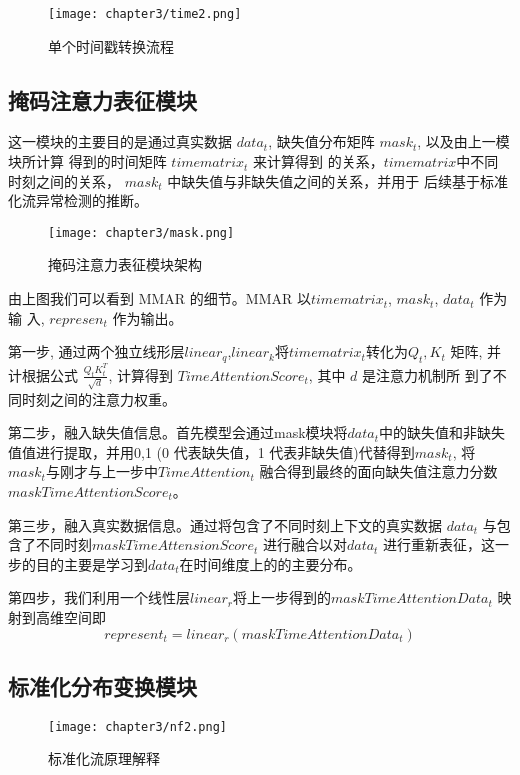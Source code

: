   \begin{figure}[ht]
    \centering
    \texttt{[image: chapter3/time2.png]}
    \caption{单个时间戳转换流程}
    \end{figure}
  
  \subsection{掩码注意力表征模块}
  这一模块的主要目的是通过真实数据 $data_t$, 缺失值分布矩阵 $mask_t$, 以及由上一模块所计算 得到的时间矩阵 $timematrix_t$ 来计算得到 的关系，$timematrix $中不同时刻之间的关系， $mask_t$ 中缺失值与非缺失值之间的关系，并用于 后续基于标准化流异常检测的推断。
  
  \begin{figure}[ht]
    \centering
    \texttt{[image: chapter3/mask.png]}
    \caption{掩码注意力表征模块架构}
    \end{figure}
  
  由上图我们可以看到 MMAR 的细节。MMAR 以$timematrix_t$, $mask_t$, $data_t$ 作为输 入, $represen_t$ 作为输出。
  
  第一步, 通过两个独立线形层$linear_q$,$linear_k$将$timematrix_t$转化为$Q_t, K_t$ 矩阵, 并计根据公式 $\frac{Q_t K_t^T}{\sqrt{d}}$, 计算得到 $TimeAttentionScore_t$, 其中 $d$ 是注意力机制所 到了不同时刻之间的注意力权重。
  
  第二步，融入缺失值信息。首先模型会通过mask模块将$data_t$中的缺失值和非缺失值值进行提取，并用0,1 (0 代表缺失值，1 代表非缺失值)代替得到$mask_t$, 将$mask_t$与刚才与上一步中$TimeAttention_t$ 融合得到最终的面向缺失值注意力分数$maskTimeAttentionScore_t$。
  
  第三步，融入真实数据信息。通过将包含了不同时刻上下文的真实数据 $data_t$ 与包含了不同时刻$maskTimeAttensionScore_t$  进行融合以对$data_t$ 进行重新表征，这一步的目的主要是学习到$data_t $在时间维度上的的主要分布。
  
  第四步，我们利用一个线性层$linear_r$将上一步得到的$maskTimeAttentionData_t$ 映射到高维空间即 
  \begin{equation}
    represent_t=linear_r(maskTimeAttentionData_t)
  \end{equation}
  
  \subsection{标准化分布变换模块}
  \begin{figure}[ht]
    \centering
    \texttt{[image: chapter3/nf2.png]}
    \caption{标准化流原理解释}
    \end{figure}
  
